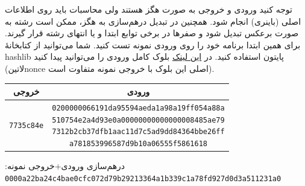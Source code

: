 توجه کنید ورودی و خروجی به صورت هگز هستند ولی محاسبات باید روی اطلاعات اصلی (باینری) انجام شود. همچنین در تبدیل درهم‌سازی به هگز، ممکن است رشته به صورت برعکس تبدیل شود و صفرها در برخی توابع ابتدا و یا انتهای رشته قرار گیرند. برای همین ابتدا برنامه خود را روی ورودی نمونه تست کنید. شما می‌توانید از کتابخانهٔ hashlib پایتون استفاده کنید.
در
\href{https://webbtc.com/block/000000000000000001f942eb4bfa0aeccb6a14c268f4c72d5fff17270da771b9}{این لینک}
بلوک کامل ورودی را می‌توانید پیدا کنید (‌لاتین{nonce} اصلی این بلوک با خروجی نمونه متفاوت است).

\begin{center}\small
	\begin{tabular}{|c|c|}
		\hline
		خروجی                 
		            & ورودی    \\ \hline
\texttt{7735c84e} &
\parbox[t]{8.1cm}{\normalsize\raggedright{\texttt{0200000066191da95594aeda1a98a19ff054a88a\\
510754e2a4d93e0a00000000000000008485ae79\\
7312b2cb37dfb1aac11d7c5ad9dd84364bbe26ff\\
a781853996587d9b10a06555f5861618}}\vspace{0.2cm}}
 \\ \hline
	\end{tabular}
\end{center}
درهم‌سازی ورودی+خروجی نمونه:
{\small\texttt{0000a22ba24c4bae0cfc072d79b29213364a1b339c1a78fd927d0d3a511231a0}}









